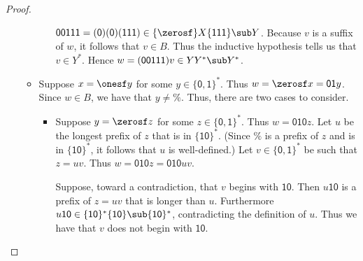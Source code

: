 \begin{proof}
\begin{itemize}
\begin{itemize}
\begin{itemize}
      $\mathsf{00111}=\mathsf{(0)(0)(111)}\in\{\zerosf\}X\{\mathsf{111}\}\sub
      Y$.  Because $v$ is a suffix of $w$, it follows that $v\in B$.
      Thus the inductive hypothesis tells us that $v\in Y^*$.  Hence
      $w=\mathsf{(00111)}v\in YY^*\sub Y^*$.
    \end{itemize}
  \item Suppose $x=\onesf y$ for some $y\in\mathsf{\{0,1\}}^*$.  Thus
    $w=\zerosf x=\mathsf{01}y$.  Since $w\in B$, we have that
    $y\neq\%$.  Thus, there are two cases to consider.
    \begin{itemize}
    \item Suppose $y=\zerosf z$ for some $z\in\mathsf{\{0,1\}}^*$.
      Thus $w=\mathsf{010}z$.  Let $u$ be the longest prefix of $z$
      that is in $\{\mathsf{10}\}^*$.  (Since $\%$ is a prefix of $z$
      and is in $\{\mathsf{10}\}^*$, it follows that $u$ is
      well-defined.)  Let $v\in\mathsf{\{0,1\}}^*$ be such that
      $z=uv$.  Thus $w=\mathsf{010}z=\mathsf{010}uv$.

      Suppose, toward a contradiction, that $v$ begins with
      $\mathsf{10}$.  Then $u\mathsf{10}$ is a prefix of $z=uv$ that
      is longer than $u$.  Furthermore
      $u\mathsf{10}\in\{\mathsf{10}\}^*\{\mathsf{10}\}\sub
      \{\mathsf{10}\}^*$, contradicting the definition of $u$.  Thus
      we have that $v$ does not begin with $\mathsf{10}$.


\end{itemize}
\end{itemize}
\end{itemize}
\end{proof}
